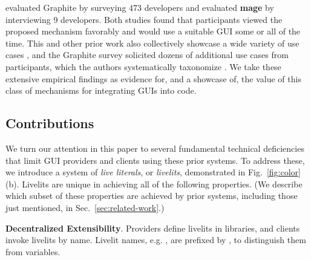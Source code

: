 \citet{Graphite} evaluated Graphite by surveying 473 developers 
and \citet{DBLP:conf/uist/KeryRHMWP20} evaluated \textbf{mage} by interviewing 9 developers.
Both studies found that
participants viewed the proposed mechanism favorably and 
would use a suitable GUI some or all of the time.
This and other prior work also collectively showcase a wide variety of use cases \cite{Graphite,DBLP:conf/uist/KeryRHMWP20,interactive-visual-syntax}, 
and the Graphite survey solicited dozens of additional use cases from participants,
which the authors systematically taxonomize \cite{Graphite}. 
We take these extensive empirical findings   
as evidence for, and a showcase of, 
the value of this class of mechanisms for integrating GUIs into code.

\subsection{Contributions}

We turn our attention in this paper to several fundamental technical
deficiencies that limit GUI providers and clients using these prior systems.
To address these, 
we introduce a system of \emph{live literals}, or \emph{livelits}, 
demonstrated in Fig.~\ref{fig:color}(b). 
Livelits are unique in achieving all of the following properties.
(We describe which subset of these properties 
are achieved by prior systems,
including those just mentioned, 
in Sec.~\ref{sec:related-work}.)

\newcommand{\llproperty}[1]{\vspace{5px}\noindent\textbf{#1}.}

\llproperty{Decentralized Extensibility}
    Providers define livelits in libraries, and 
    clients invoke livelits by name. Livelit names, e.g. ,  are prefixed by \li{\$},    
    to distinguish them from variables.
 

